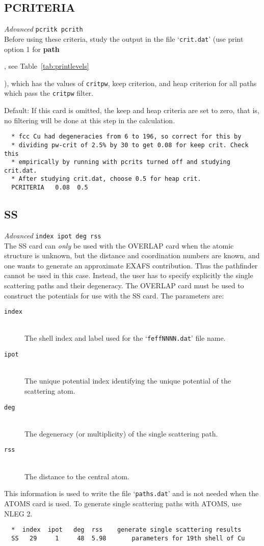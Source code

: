 \documentclass[11pt,oneside]{report} %
\renewcommand{\htmlref}[2]{\hyperlink{#2}{#1}}
\newenvironment{Card}[4]%
      {\vspace{3ex}%
        \subsection{#1}
        \quad\textsl{#3}\newline
        \quad\texttt{#2}\newline%
        \label{card:#4}\\}
      {}
\newcommand{\file}[1]{`\texttt{#1}'}
\newcommand{\module}[1]{\textrm{\bf{#1}}}
\renewcommand{\htmlref}[2]{{#1}} %
\begin{document}
\begin{Card}{PCRITERIA}{pcritk pcrith}{Advanced}{pcr}
  Before using these criteria, study the output in the file
  \file{crit.dat} (use print option 1 for \module{path}
  \begin{latexonly}
    , see Table~\ref{tab:printlevels}
  \end{latexonly}
  ), 
  which has the values of \texttt{critpw}, keep criterion, and heap criterion 
  for all paths which pass the \texttt{critpw} filter.

  Default: If this card is omitted, the keep and heap criteria are set
  to zero, that is, no filtering will be done at this step in the
  calculation.

\begin{verbatim}
  * fcc Cu had degeneracies from 6 to 196, so correct for this by
  * dividing pw-crit of 2.5% by 30 to get 0.08 for keep crit. Check this
  * empirically by running with pcrits turned off and studying crit.dat.
  * After studying crit.dat, choose 0.5 for heap crit.
  PCRITERIA   0.08  0.5
\end{verbatim}
\end{Card}



\begin{Card}{SS}{index ipot deg rss}{Advanced}{ss}
  The SS card can {\it only} be used with the \htmlref{OVERLAP}{card:ove} card
  when the atomic structure is unknown, but the distance and coordination
  numbers are known, and one wants to generate an approximate EXAFS 
  contribution. Thus the pathfinder cannot be used in this
  case. Instead, the user has to specify explicitly the single
  scattering paths and their degeneracy. The OVERLAP card must be used
  to construct the potentials for use with the SS card. The
  parameters are:
\begin{description}
\item[\texttt{index}]\hfill\\
  The shell index and label used for the \file{feffNNNN.dat} file name.
\item[\texttt{ipot}]\hfill\\
  The unique potential index identifying the unique potential 
  of the scattering atom.
\item[\texttt{deg}]\hfill\\
  The degeneracy (or multiplicity) of the single scattering path.
\item[\texttt{rss}]\hfill\\ 
  The distance to the central atom.
\end{description}
  This information is used to write the file \file{paths.dat} and is not
  needed when the \htmlref{ATOMS}{card:ato} card is used. To generate single
  scattering paths with ATOMS, use \htmlref{NLEG}{card:nle} 2.
\begin{verbatim}
  *  index  ipot   deg  rss    generate single scattering results
  SS   29     1     48  5.98       parameters for 19th shell of Cu
\end{verbatim}
\end{Card}
\end{document}
